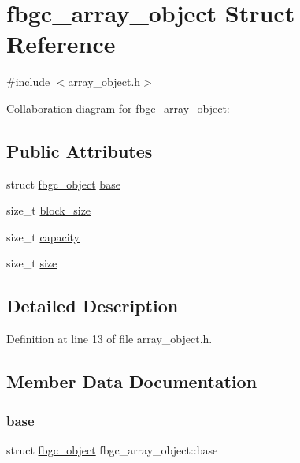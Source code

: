 \hypertarget{structfbgc__array__object}{}\section{fbgc\+\_\+array\+\_\+object Struct Reference}
\label{structfbgc__array__object}


{\ttfamily \#include $<$array\+\_\+object.\+h$>$}



Collaboration diagram for fbgc\+\_\+array\+\_\+object\+:
\subsection*{Public Attributes}
\begin{DoxyCompactItemize}
\item 
struct \hyperlink{structfbgc__object}{fbgc\+\_\+object} \hyperlink{structfbgc__array__object_a598b4040bb07190bbeb5316452e7212c}{base}
\item 
size\+\_\+t \hyperlink{structfbgc__array__object_a024fd5a28429dcd8df1b67ff92187a4c}{block\+\_\+size}
\item 
size\+\_\+t \hyperlink{structfbgc__array__object_aa90d801bf3a8c5424d819aa127a76476}{capacity}
\item 
size\+\_\+t \hyperlink{structfbgc__array__object_a9cfe79f57b1a314ca1d3f2a509fe1afe}{size}
\end{DoxyCompactItemize}


\subsection{Detailed Description}


Definition at line 13 of file array\+\_\+object.\+h.



\subsection{Member Data Documentation}
\mbox{\label{structfbgc__array__object_a598b4040bb07190bbeb5316452e7212c}} 
\subsubsection{\texorpdfstring{base}{base}}
{\footnotesize\ttfamily struct \hyperlink{structfbgc__object}{fbgc\+\_\+object} fbgc\+\_\+array\+\_\+object\+::base}



